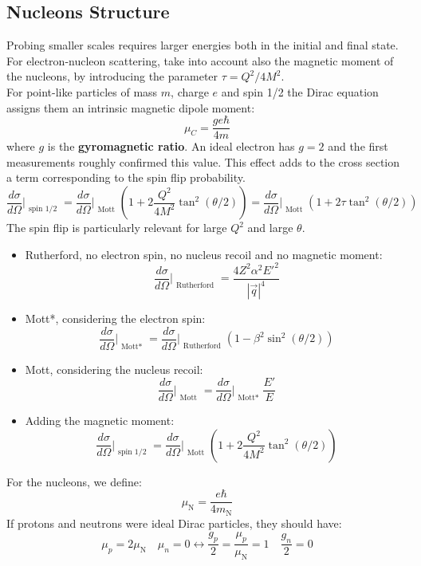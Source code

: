\documentclass[10.75pt,a4paper,openright,bottom=2cm]{article}
\newcommand{\beginbox}[1]{\begin{tcolorbox}[width=\textwidth,colback={yellow!50},title={#1},colbacktitle={gray!50},coltitle=black]}
\renewcommand{\endbox}{\end{tcolorbox}\noindent}
\begin{document}
\subsection{Nucleons Structure}
Probing smaller scales requires larger energies both in the initial and final state. For electron-nucleon scattering, take into account also the magnetic moment of the nucleons, by introducing the parameter $\tau=Q^2/4M^2$.\\
For point-like particles of mass $m$, charge $e$ and spin 1/2 the Dirac equation assigns them an intrinsic magnetic dipole moment: 
\[
\mu_C=\frac{ge\hbar}{4m}
\]
where $g$ is the \textbf{gyromagnetic ratio}. An ideal electron has $g=2$ and the first measurements roughly confirmed this value. This effect adds to the cross section a term corresponding to the spin flip probability.
\[
\frac{d\sigma}{d\Omega}\Bigr|_{\substack{\text{spin 1/2}}}=\frac{d\sigma}{d\Omega}\Bigr|_{\substack{\text{Mott}}}\left(1+2\frac{Q^2}{4M^2}\tan^2(\theta/2)\right)=\frac{d\sigma}{d\Omega}\Bigr|_{\substack{\text{Mott}}}\left(1+2\tau\tan^2(\theta/2)\right)
\]
The spin flip is particularly relevant for large $Q^2$ and large $\theta$.\\
\beginbox{Scattering Summary}
\begin{itemize}
    \item Rutherford, no electron spin, no nucleus recoil and no magnetic moment:
    \[
    \frac{d\sigma}{d\Omega}\Bigr|_{\substack{\text{Rutherford}}}=\frac{4Z^2\alpha^2E'^2}{|\Vec{q}|^4}
    \]
    \item Mott*, considering the electron spin:
    \[
    \frac{d\sigma}{d\Omega}\Bigr|_{\substack{\text{Mott*}}}=\frac{d\sigma}{d\Omega}\Bigr|_{\substack{\text{Rutherford}}}\left(1-\beta^2\sin^2(\theta/2)\right)
    \]
    \item Mott, considering the nucleus recoil:
    \[
    \frac{d\sigma}{d\Omega}\Bigr|_{\substack{\text{Mott}}}=\frac{d\sigma}{d\Omega}\Bigr|_{\substack{\text{Mott*}}}\frac{E'}{E}
    \]
    \item Adding the magnetic moment:
    \[
    \frac{d\sigma}{d\Omega}\Bigr|_{\substack{\text{spin 1/2}}}=\frac{d\sigma}{d\Omega}\Bigr|_{\substack{\text{Mott}}}\left(1+2\frac{Q^2}{4M^2}\tan^2(\theta/2)\right)
    \]
\end{itemize}
\endbox
For the nucleons, we define:
\[
\mu_{\text{N}}=\frac{e\hbar}{4m_{\text{N}}}
\]
If protons and neutrons were ideal Dirac particles, they should have:
\[
\mu_p=2\mu_{\text{N}} \quad \mu_n=0\longleftrightarrow\frac{g_p}{2}=\frac{\mu_p}{\mu_{\text{N}}}=1 \quad \frac{g_n}{2}=0
\]
\end{document}
